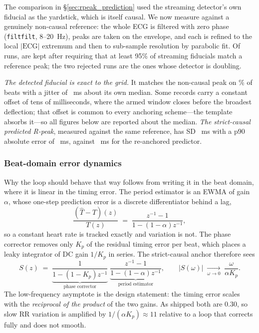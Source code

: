 \documentclass[11pt]{article}
\begin{document}
The comparison in \S\ref{sec:rpeak_prediction} used the streaming detector's own fiducial as the
yardstick, which is itself causal. We now measure against a genuinely non-causal reference: the
whole ECG is filtered with zero phase (\texttt{filtfilt}, 8--20~Hz), peaks are taken on the
envelope, and each is refined to the local $|\mathrm{ECG}|$ extremum and then to sub-sample
resolution by parabolic fit. Of \rbNrunsAll{} runs, \rbNruns{} are kept after requiring that at
least 95\% of streaming fiducials match a reference peak; the two rejected runs are the ones whose
detector is doubling.

\emph{The detected fiducial is exact to the grid.} It matches the non-causal peak on
\rbMatch{}\% of beats with a jitter of \rbFidJitter{}~ms about its own median. Some records carry a
constant offset of tens of milliseconds, where the armed window closes before the broadest
deflection; that offset is common to every anchoring scheme---the template absorbs it---so all
figures below are reported about the median. \emph{The strict-causal predicted R-peak}, measured
against the same reference, has SD \rbPllSd{}~ms with a p90 absolute error of \rbPllPninety{}~ms,
against \rbOlSd{}~ms for the re-anchored predictor.

\subsubsection*{Beat-domain error dynamics}

Why the loop should behave that way follows from writing it in the beat domain, where it is linear
in the timing error. The period estimator is an EWMA of gain $\alpha$, whose one-step prediction
error is a discrete differentiator behind a lag,
\begin{equation}
\frac{(\hat{T}-T)(z)}{T(z)} \;=\; \frac{z^{-1}-1}{1-(1-\alpha)z^{-1}},
\label{eq:ewma}
\end{equation}
so a constant heart rate is tracked exactly and variation is not. The phase corrector removes only
$K_p$ of the residual timing error per beat, which places a leaky integrator of DC gain $1/K_p$ in
series. The strict-causal anchor therefore sees
\begin{equation}
S(z) \;=\; \underbrace{\frac{1}{1-(1-K_p)z^{-1}}}_{\text{phase corrector}}\;
\underbrace{\frac{z^{-1}-1}{1-(1-\alpha)z^{-1}}}_{\text{period estimator}},
\qquad
|S(\omega)| \;\xrightarrow[\omega\to 0]{}\; \frac{\omega}{\alpha K_p}.
\label{eq:S}
\end{equation}
The low-frequency asymptote is the design statement: the timing error scales with the
\emph{reciprocal of the product} of the two gains. As shipped both are $0.30$, so slow RR variation
is amplified by $1/(\alpha K_p) \approx 11$ relative to a loop that corrects fully and does not
smooth.
\end{document}

